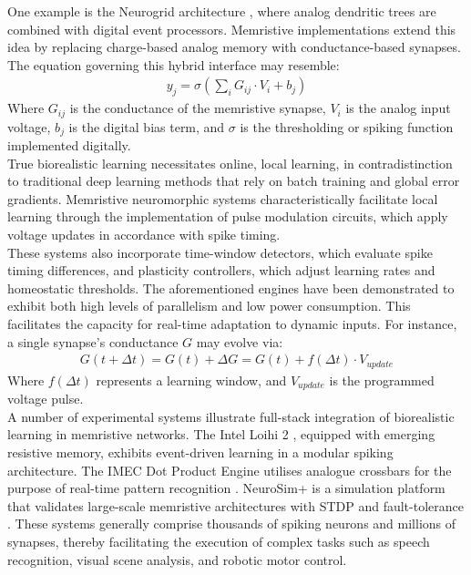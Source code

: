 \noindent One example is the Neurogrid architecture \cite{khodagholy2015neurogrid}, where analog dendritic trees are combined with digital event processors. Memristive implementations extend this idea by replacing charge-based analog memory with conductance-based synapses. The equation governing this hybrid interface may resemble:
\begin{align}
    y_j = \sigma \left( \sum_i G_{ij} \cdot V_i + b_j  \right) \label{eq:2.40}
\end{align}
\noindent Where $G_{ij}$ is the conductance of the memristive synapse, $V_i$ is the analog input voltage, $b_j$ is the digital bias term, and $\sigma$ is the thresholding or spiking function implemented digitally. \\

\noindent True biorealistic learning necessitates online, local learning, in contradistinction to traditional deep learning methods that rely on batch training and global error gradients. Memristive neuromorphic systems characteristically facilitate local learning through the implementation of pulse modulation circuits, which apply voltage updates in accordance with spike timing. \\

\noindent These systems also incorporate time-window detectors, which evaluate spike timing differences, and plasticity controllers, which adjust learning rates and homeostatic thresholds. The aforementioned engines have been demonstrated to exhibit both high levels of parallelism and low power consumption. This facilitates the capacity for real-time adaptation to dynamic inputs. For instance, a single synapse’s conductance $G$ may evolve via:
\begin{align}
    G(t + \Delta t) = G(t) + \Delta G = G(t) + f(\Delta t) \cdot V_{update} \label{eq:2.41}
\end{align}
\noindent Where $f(\Delta t)$ represents a learning window, and $V_{update}$ is the programmed voltage pulse.\\


\noindent A number of experimental systems illustrate full-stack integration of biorealistic learning in memristive networks. The Intel Loihi 2 \cite{orchard2021efficient}, equipped with emerging resistive memory, exhibits event-driven learning in a modular spiking architecture. The IMEC Dot Product Engine utilises analogue crossbars for the purpose of real-time pattern recognition \cite{zha2017imec}. NeuroSim+ is a simulation platform that validates large-scale memristive architectures with STDP and fault-tolerance \cite{chen2017neurosim+}. These systems generally comprise thousands of spiking neurons and millions of synapses, thereby facilitating the execution of complex tasks such as speech recognition, visual scene analysis, and robotic motor control. \\

